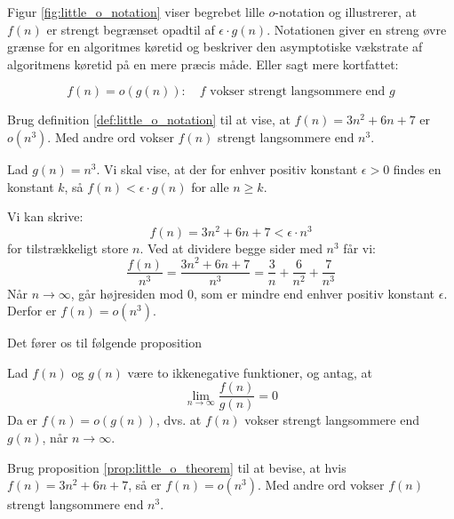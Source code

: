 Figur \ref{fig:little_o_notation} viser begrebet lille $o$-notation og illustrerer, at $f(n)$ er strengt begrænset opadtil af $\epsilon \cdot g(n)$. Notationen giver en streng øvre grænse for en algoritmes køretid og beskriver den asymptotiske vækstrate af algoritmens køretid på en mere præcis måde. Eller sagt mere kortfattet:

\[
f(n)=o(g(n)): \quad f \text{ vokser strengt langsommere end } g
\]

\begin{example}
    Brug definition \ref{def:little_o_notation} til at vise, at $f(n)=3n^2+6n+7$ er $o(n^3)$. Med andre ord vokser $f(n)$ strengt langsommere end $n^3$.
\end{example}

\begin{solution}
    Lad $g(n) = n^3$. Vi skal vise, at der for enhver positiv konstant $\epsilon > 0$ findes en konstant $k$, så $f(n) < \epsilon \cdot g(n)$ for alle $n \geq k$.

    Vi kan skrive:
    \[
    f(n) = 3n^2 + 6n + 7 < \epsilon \cdot n^3
    \]
    for tilstrækkeligt store $n$. Ved at dividere begge sider med $n^3$ får vi:
    \[
    \frac{f(n)}{n^3} = \frac{3n^2 + 6n + 7}{n^3} = \frac{3}{n} + \frac{6}{n^2} + \frac{7}{n^3}
    \]
    Når $n \to \infty$, går højresiden mod $0$, som er mindre end enhver positiv konstant $\epsilon$. Derfor er $f(n) = o(n^3)$.
\end{solution}

Det fører os til følgende proposition

\begin{proposition} \label{prop:little_o_theorem}
    Lad \( f(n) \) og \( g(n) \) være to ikkenegative funktioner, og antag, at
    \medskip
    \[
    \lim_{n \rightarrow \infty} \frac{f(n)}{g(n)} = 0
    \]
    \medskip
    Da er \( f(n) = o(g(n)) \), dvs. at \( f(n) \) vokser strengt langsommere end \( g(n) \), når \( n \to \infty \).
\end{proposition}

\begin{example}
    Brug proposition \ref{prop:little_o_theorem} til at bevise, at hvis \( f(n) = 3n^2 + 6n + 7 \), så er \( f(n) = o(n^3) \). Med andre ord vokser \( f(n) \) strengt langsommere end \( n^3 \).

\end{example}

